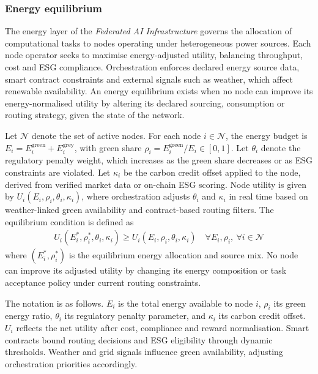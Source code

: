 \documentclass[oneside,10pt]{swissi}
\begin{document}
\subsubsection{Energy equilibrium}

The energy layer of the \textit{Federated AI Infrastructure} governs the allocation of computational tasks to nodes operating under heterogeneous power sources. Each node operator seeks to maximise energy-adjusted utility, balancing throughput, cost and ESG compliance. Orchestration enforces declared energy source data, smart contract constraints and external signals such as weather, which affect renewable availability. An energy equilibrium exists when no node can improve its energy-normalised utility by altering its declared sourcing, consumption or routing strategy, given the state of the network.

Let \( \mathcal{N} \) denote the set of active nodes. For each node \( i \in \mathcal{N} \), the energy budget is \( E_i = E_i^{\text{green}} + E_i^{\text{grey}} \), with green share \( \rho_i = E_i^{\text{green}} / E_i \in [0,1] \). Let \( \theta_i \) denote the regulatory penalty weight, which increases as the green share decreases or as ESG constraints are violated. Let \( \kappa_i \) be the carbon credit offset applied to the node, derived from verified market data or on-chain ESG scoring. Node utility is given by \( U_i(E_i, \rho_i, \theta_i, \kappa_i) \), where orchestration adjusts \( \theta_i \) and \( \kappa_i \) in real time based on weather-linked green availability and contract-based routing filters. The equilibrium condition is defined as
\begin{align}
U_i(E_i^*, \rho_i^*, \theta_i, \kappa_i) \ge U_i(E_i, \rho_i, \theta_i, \kappa_i) \quad \forall E_i, \rho_i,\ \forall i \in \mathcal{N}
\end{align}
where \( (E_i^*, \rho_i^*) \) is the equilibrium energy allocation and source mix. No node can improve its adjusted utility by changing its energy composition or task acceptance policy under current routing constraints.

The notation is as follows. \( E_i \) is the total energy available to node \( i \), \( \rho_i \) its green energy ratio, \( \theta_i \) its regulatory penalty parameter, and \( \kappa_i \) its carbon credit offset. \( U_i \) reflects the net utility after cost, compliance and reward normalisation. Smart contracts bound routing decisions and ESG eligibility through dynamic thresholds. Weather and grid signals influence green availability, adjusting orchestration priorities accordingly.
\end{document}
